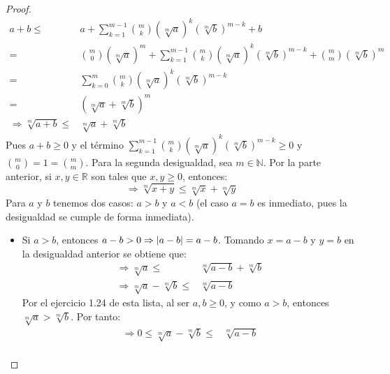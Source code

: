 \documentclass[12pt]{article}
\begin{document}
\begin{enumerate}
\begin{proof}
        \begin{equation*}
            \begin{split}
                a+b\leq& a+\sum_{k=1}^{m-1}{m \choose k}\left(\sqrt[m]{a}\right)^k\left(\sqrt[m]{b}\right)^{m-k}+b\\
                =& {m \choose 0}\left(\sqrt[m]{a}\right)^m+\sum_{k=1}^{m-1}{m \choose k}\left(\sqrt[m]{a}\right)^k\left(\sqrt[m]{b}\right)^{m-k}+{m \choose m}\left(\sqrt[m]{b}\right)^m\\
                =&\sum_{k=0}^{m}{m \choose k}\left(\sqrt[m]{a}\right)^k\left(\sqrt[m]{b}\right)^{m-k}\\
                =&\left(\sqrt[m]{a}+\sqrt[m]{b}\right)^m\\
                \Rightarrow \sqrt[m]{a+b}\leq&\sqrt[m]{a}+\sqrt[m]{b}
            \end{split}
        \end{equation*}
        Pues $a+b\geq0$ y el término $\sum_{k=1}^{m-1}{m \choose k}\left(\sqrt[m]{a}\right)^k\left(\sqrt[m]{b}\right)^{m-k}\geq0$ y ${m \choose 0}=1={m \choose m}$. Para la segunda desigualdad, sea $m\in\mathbb{N}$. Por la parte anterior, si $x,y\in\mathbb{R}$ son tales que $x,y\geq 0$, entonces:
        \begin{equation*}
            \Rightarrow \sqrt[m]{x+y}\leq\sqrt[m]{x}+\sqrt[m]{y}
        \end{equation*}
        Para $a$ y $b$ tenemos dos casos: $a>b$ y $a<b$ (el caso $a=b$ es inmediato, pues la desigualdad se cumple de forma inmediata).
        \begin{itemize}
            \item Si $a>b$, entonces $a-b> 0\Rightarrow \left| a-b \right|=a-b$. Tomando $x=a-b$ y $y=b$ en la desigualdad anterior se obtiene que:
            \begin{equation*}
                \begin{split}
                    \Rightarrow \sqrt[m]{a}\leq&\sqrt[m]{a-b}+\sqrt[m]{b}\\
                    \Rightarrow \sqrt[m]{a}-\sqrt[m]{b}\leq&\sqrt[m]{a-b}
                \end{split}
            \end{equation*}
            Por el ejercicio 1.24 de esta lista, al ser $a,b\geq 0$, y como $a>b$, entonces $\sqrt[m]{a}>\sqrt[m]{b}$. Por tanto:
            \begin{equation*}
                \begin{split}
                    \Rightarrow 0\leq\sqrt[m]{a}-\sqrt[m]{b}\leq&\sqrt[m]{a-b}\\

\end{split}
\end{equation*}
\end{itemize}
\end{proof}
\end{enumerate}
\end{document}
